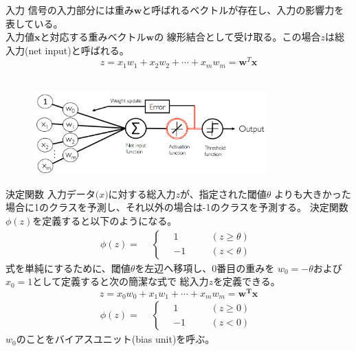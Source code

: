 \documentclass[aspectratio=169, dvipdfmx, 11pt]{beamer} %
\begin{document}
\begin{frame}{入力}
    信号の入力部分には重み\(\bm{w}\)と呼ばれるベクトルが存在し、入力の影響力を表している。 \\
    入力値\(\bm{x}\)と対応する重みベクトル\(\bm{w}\)の
    線形結合として受け取る。この場合\(z\)は総入力(net input)と呼ばれる。
    \\
    \begin{equation*}
        z = x_1w_1 + x_2w_2 + \cdots  + x_mw_m = \bm{w}^T\bm{x}
    \end{equation*}
    \\
    \begin{figure}[b]
        \begin{center}
        \includegraphics[width=90mm]{img/day01/fig08.png}
        \end{center}
    \end{figure}
\end{frame}

\begin{frame}{決定関数}
    入力データ\(\bm(x)\)に対する総入力\(z\)が、指定された閾値\(\theta\)
    よりも大きかった場合に1のクラスを予測し、それ以外の場合は-1のクラスを予測する。
    決定関数\(\phi(z)\)を定義すると以下のようになる。
    \begin{equation*}
        \phi(z) = 
        \begin{aligned}
            & \left\{ \,
                \begin{aligned}
                    &  1 & \quad &(z \geq \theta) \\
                    & -1 & \quad &(z < \theta)
                \end{aligned}
            \right.
        \end{aligned}
    \end{equation*}
    式を単純にするために、閾値\(\theta\)を左辺へ移項し、0番目の重みを
    \(w_0 = -\theta\)および\(x_0 = 1\)として定義すると次の簡潔な式で
    総入力\(z\)を定義できる。
    \begin{equation*}
        z = x_0w_0 + x_1w_1 + \cdots  + x_mw_m = \bm{w^T}\bm{x}
    \end{equation*}
    \begin{equation*}
        \phi(z) = 
        \begin{aligned}
            & \left\{ \,
                \begin{aligned}
                    &  1 & \quad &(z \geq 0) \\
                    & -1 & \quad &(z < 0)
                \end{aligned}
            \right.
        \end{aligned}
    \end{equation*}
    \(w_0\)のことをバイアスユニット(bias unit)を呼ぶ。
\end{frame}
\end{document}
